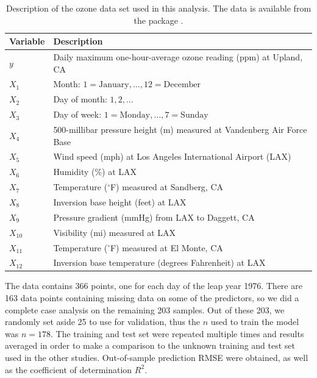\documentclass[11pt,twoside,openright]{report}
\begin{document}
\begin{table}[htbp]
\centering
\caption[Description of the ozone data set]{Description of the ozone data set used in this analysis. The data is available from the  package  \citep{mlbench}.}
\label{tab:ozone}
\begin{tabular}{ll}
\toprule
Variable     & Description \\
\midrule
$y$      & Daily maximum one-hour-average ozone reading (ppm) at Upland, CA \\
$X_1$    & Month: $1 = \text{January}, \dots, 12 = \text{December}$\\
$X_2$    & Day of month: $1,2,\dots$ \\
$X_3$    & Day of week: $1 = \text{Monday}, \dots, 7 = \text{Sunday}$ \\
$X_4$    & 500-millibar pressure height (m) measured at Vandenberg Air Force Base \\
$X_5$    & Wind speed (mph) at Los Angeles International Airport (LAX) \\
$X_6$    & Humidity (\%) at LAX \\
$X_7$    & Temperature ($^\circ$F) measured at Sandberg, CA \\
$X_8$    & Inversion base height (feet) at LAX \\
$X_9$    & Pressure gradient (mmHg) from LAX to Daggett, CA \\
$X_{10}$ & Visibility (mi) measured at LAX \\
$X_{11}$ & Temperature ($^\circ$F) measured at El Monte, CA \\      
$X_{12}$ & Inversion base temperature (degrees Fahrenheit) at LAX \\             
\end{tabular}

\end{table}

The data contains 366 points, one for each day of the leap year 1976. 
There are 163 data points containing missing data on some of the predictors, so we did a complete case analysis on the remaining 203 samples. 
Out of these 203, we randomly set aside 25 to use for validation, thus the $n$ used to train the model was $n=178$. 
The training and test set were repeated multiple times and results averaged in order to make a comparison to the unknown training and test set used in the other studies.
Out-of-sample prediction RMSE were obtained, as well as the coefficient of determination $R^2$.
\end{document}
